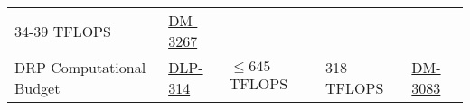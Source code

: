 \documentclass[DM,toc]{lsstdoc}
\begin{document}
\begin{longtable}[]{@{}lllll@{}}
\begin{minipage}[t]{0.14\columnwidth}
34-39 TFLOPS\strut
\end{minipage} & \begin{minipage}[t]{0.17\columnwidth}\raggedright\strut
\href{https://jira.lsstcorp.org/browse/DM-3267}{DM-3267}\strut
\end{minipage}\tabularnewline
\begin{minipage}[t]{0.22\columnwidth}\raggedright\strut
DRP Computational Budget\strut
\end{minipage} & \begin{minipage}[t]{0.11\columnwidth}\raggedright\strut
\href{https://jira.lsstcorp.org/browse/DLP-314}{DLP-314}\strut
\end{minipage} & \begin{minipage}[t]{0.21\columnwidth}\raggedright\strut
\(\leq 645\) TFLOPS\strut
\end{minipage} & \begin{minipage}[t]{0.14\columnwidth}\raggedright\strut
318 TFLOPS\strut
\end{minipage} & \begin{minipage}[t]{0.17\columnwidth}\raggedright\strut
\href{https://jira.lsstcorp.org/browse/DM-3083}{DM-3083}\strut
\end{minipage}\tabularnewline
\bottomrule
\end{longtable}


\end{document}
